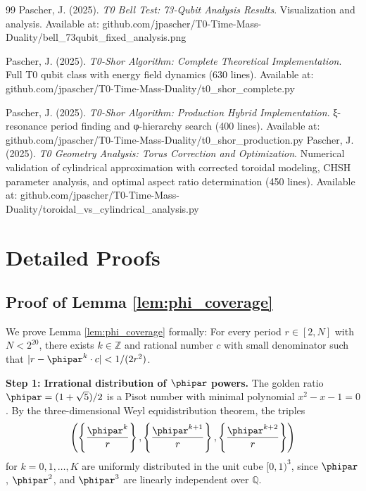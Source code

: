 \begin{thebibliography}{99}
	Pascher, J. (2025). 
	\textit{T0 Bell Test: 73-Qubit Analysis Results}. 
	Visualization and analysis. Available at: github.com/jpascher/T0-Time-Mass-Duality/bell\_73qubit\_fixed\_analysis.png
	
	Pascher, J. (2025). 
	\textit{T0-Shor Algorithm: Complete Theoretical Implementation}. 
	Full T0 qubit class with energy field dynamics (630 lines). Available at: github.com/jpascher/T0-Time-Mass-Duality/t0\_shor\_complete.py
	
	Pascher, J. (2025). 
	\textit{T0-Shor Algorithm: Production Hybrid Implementation}. 
	ξ-resonance period finding and φ-hierarchy search (400 lines). Available at: github.com/jpascher/T0-Time-Mass-Duality/t0\_shor\_production.py
	Pascher, J. (2025). 
	\textit{T0 Geometry Analysis: Torus Correction and Optimization}. 
	Numerical validation of cylindrical approximation with corrected toroidal modeling, CHSH parameter analysis, and optimal aspect ratio determination (450 lines). Available at: github.com/jpascher/T0-Time-Mass-Duality/toroidal\_vs\_cylindrical\_analysis.py
\end{thebibliography}

\appendix

\section{Detailed Proofs}
\label{app:proofs}

\subsection{Proof of Lemma \ref{lem:phi_coverage}}
\label{app:proof_phi_coverage}

We prove Lemma \ref{lem:phi_coverage} formally: For every period $r \in [2, N]$ with $N < 2^{20}$, there exists $k \in \mathbb{Z}$ and rational number $c$ with small denominator such that $|r - \phipar^k \cdot c| < 1/(2r^2)$.

\textbf{Step 1: Irrational distribution of $\phipar$ powers.}
The golden ratio $\phipar = (1+\sqrt{5})/2$ is a Pisot number with minimal polynomial $x^2 - x - 1 = 0$. By the three-dimensional Weyl equidistribution theorem, the triples
\[
\left(\left\{\frac{\phipar^k}{r}\right\}, \left\{\frac{\phipar^{k+1}}{r}\right\}, \left\{\frac{\phipar^{k+2}}{r}\right\}\right)
\]
for $k = 0, 1, \ldots, K$ are uniformly distributed in the unit cube $[0,1)^3$, since $\phipar$, $\phipar^2$, and $\phipar^3$ are linearly independent over $\mathbb{Q}$.

